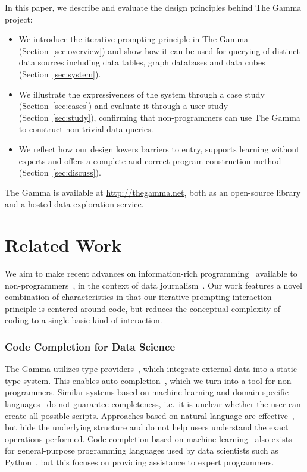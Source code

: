 \documentclass[conference]{IEEEtran}
\begin{document}
\IEEEpubidadjcol
In this paper, we describe and evaluate the design principles behind The Gamma project:

\begin{itemize}
\setlength\itemsep{0.25em}
\item We introduce the iterative prompting principle in The Gamma (Section~\ref{sec:overview})
  and show how it can be used for querying of distinct data sources including data tables, graph
  databases and data cubes (Section~\ref{sec:system}).

\item We illustrate the expressiveness of the system through a case study (Section~\ref{sec:cases})
  and evaluate it through a user study (Section~\ref{sec:study}), confirming that non-programmers
  can use The Gamma to construct non-trivial data queries.

\item We reflect how our design lowers barriers to entry, supports learning without experts and offers a
  complete and correct program construction method (Section~\ref{sec:discuss}).
\end{itemize}

\noindent
The Gamma is available at \url{http://thegamma.net},
both as an open-source library and a hosted data exploration service.


\section{Related Work}
\noindent
We aim to make recent advances on information-rich programming~\cite{inforich} available to
non-programmers~\cite{enduser,smallmatter}, in the context of data journalism~\cite{ddj}.
Our work features a novel combination of characteristics in that our iterative prompting
interaction principle is centered around code, but reduces the conceptual complexity of coding to
a single basic kind of interaction.

\vspace{0.5em}
\subsubsection*{Code Completion for Data Science}

The Gamma utilizes type providers~\cite{inforich,fsdata}, which integrate external data into a
static type system. This enables auto-completion~\cite{assistants}, which we turn into a tool for
non-programmers. Similar systems based on machine learning and domain specific
languages~\cite{predictive,proactive} do not guarantee completeness, i.e.~it is unclear whether the user
can create all possible scripts. Approaches based on natural language are
effective~\cite{eviza,codemend,iris}, but hide the underlying structure and do not help users understand
the exact operations performed. Code completion based on machine learning~\cite{mlcomplete,statcomplete}
also exists for general-purpose programming languages used by data scientists such as
Python~\cite{pythia}, but this focuses on providing assistance to expert programmers.
\end{document}
